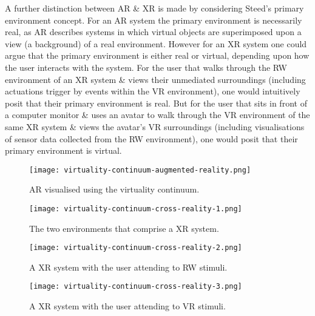 A further distinction between AR \& XR is made by considering Steed's primary environment concept. For an AR system the primary environment is necessarily real, as AR describes systems in which virtual objects are superimposed upon a view (a background) of a real environment. However for an XR system one could argue that the primary environment is either real or virtual, depending upon how the user interacts with the system. For the user that walks through the RW environment of an XR system \& views their unmediated surroundings (including actuations trigger by events within the VR environment), one would intuitively posit that their primary environment is real. But for the user that sits in front of a computer monitor \& uses an avatar to walk through the VR environment of the same XR system \& views the avatar's VR surroundings (including visualisations of sensor data collected from the RW environment), one would posit that their primary environment is virtual.

\begin{figure}[h]
	\begin{center}
		\texttt{[image: virtuality-continuum-augmented-reality.png]}
		\caption{AR visualised using the virtuality continuum.}
		\label{virtuality-continuum-augmented-reality}
	\end{center}
\end{figure}

\begin{figure}[h]
	\begin{center}
		\texttt{[image: virtuality-continuum-cross-reality-1.png]}
		\caption{The two environments that comprise a XR system.}
		\label{virtuality-continuum-cross-reality-1}
	\end{center}
\end{figure}

\begin{figure}[h]
	\begin{center}
		\texttt{[image: virtuality-continuum-cross-reality-2.png]}
		\caption{A XR system with the user attending to RW stimuli.}
		\label{virtuality-continuum-cross-reality-2}
	\end{center}
\end{figure}

\begin{figure}[h]
	\begin{center}
		\texttt{[image: virtuality-continuum-cross-reality-3.png]}
		\caption{A XR system with the user attending to VR stimuli.}
		\label{virtuality-continuum-cross-reality-3}
	\end{center}
\end{figure}

